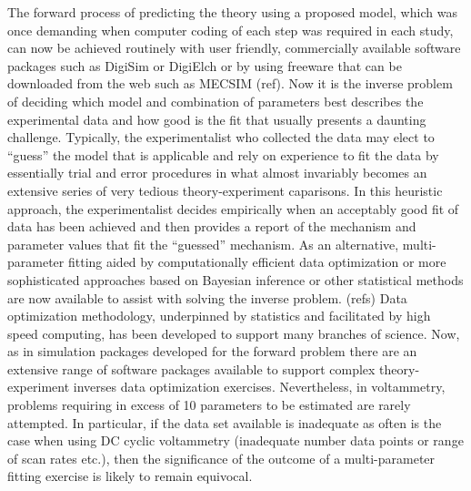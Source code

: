 \documentclass[a4paper, 12pt]{article}
\begin{document}
The  forward process of predicting the theory using a proposed model, which was 
once demanding when computer coding of each step was required in each study, can 
now be achieved routinely with user friendly, commercially available software 
packages such as DigiSim or DigiElch or by using freeware that can be downloaded 
from the web such as MECSIM (ref). Now it is the inverse problem of deciding 
which model and combination of parameters best describes the experimental data 
and how good is the fit that usually presents a daunting challenge. Typically, 
the experimentalist who collected the data may elect to “guess” the model that 
is applicable and rely on experience to fit the data by essentially trial and 
error procedures in what almost invariably becomes an extensive series of very 
tedious theory-experiment caparisons. In this heuristic approach, the 
experimentalist decides empirically when an acceptably good fit of data has been 
achieved and then provides a report of the mechanism and parameter values that 
fit the “guessed” mechanism. As an alternative, multi-parameter fitting aided by 
computationally efficient data optimization or more sophisticated approaches 
based on Bayesian inference or other statistical   methods are now available to 
assist with solving the inverse problem.  (refs) Data optimization methodology, 
underpinned by statistics and facilitated by high speed computing, has been 
developed to support many branches of science. Now, as in simulation packages 
developed for the forward problem there are an extensive range of software 
packages available to support complex theory-experiment inverses data 
optimization exercises. Nevertheless, in voltammetry, problems requiring in 
excess of 10 parameters to be estimated are rarely attempted. In particular, if 
the data set available is inadequate as often is the case when using DC cyclic 
voltammetry (inadequate number data points or range of scan rates etc.), then 
the significance of the outcome of a multi-parameter fitting exercise is likely 
to remain equivocal.
\end{document}
